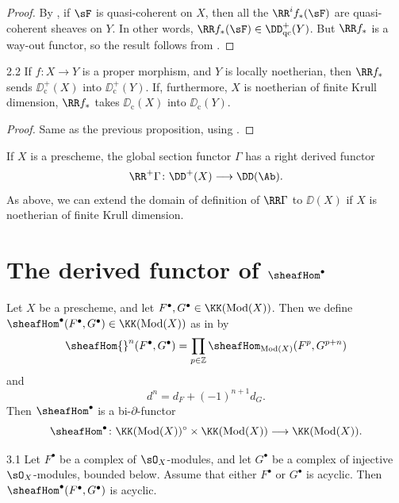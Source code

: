 \begin{proof}
By \cite[\nopp III,~1.4.10]{EGA}, if $\sF$ is quasi-coherent on $X$, then all the $\RR^if_*(\sF)$ are quasi-coherent sheaves on $Y$. In other words, $\RR f_*(\sF)\in\DD_{\mathrm{qc}}^+(Y)$. But $\RR f_*$ is a way-out functor, so the result follows from .
\end{proof}

\begin{bookproposition}{2.2}\label{prop:2.2.2}
If $f\colon X\to Y$ is a proper morphism, and $Y$ is locally noetherian, then $\RR f_*$ sends $\DD_{\mathrm{c}}^+(X)$ into $\DD_{\mathrm{c}}^+(Y)$. If, furthermore, $X$ is noetherian of finite Krull dimension, $\RR f_*$ takes $\DD_{\mathrm{c}}(X)$ into $\DD_{\mathrm{c}}(Y)$.
\end{bookproposition}

\begin{proof}
Same as the previous proposition, using \cite[\nopp III,~3.2.1]{EGA}.
\end{proof}

If $X$ is a prescheme, the global section functor $\Gamma$ has a right derived functor
\[
\RR^+\Gamma\colon \DD^+(X) \longrightarrow \DD(\Ab).
\]
As above, we can extend the domain of definition of $\RR\Gamma$ to $\DD(X)$ if $X$ is noetherian of finite Krull dimension.
\section{The derived functor of $\sheafHom^\bullet$}\label{sec:2.3}

Let $X$ be a prescheme, and let $F^\bullet,G^\bullet\in\KK(\operatorname{Mod}(X))$. Then we define $\sheafHom^\bullet(F^\bullet,G^\bullet)\in\KK(\operatorname{Mod}(X))$ as in  by
\[
\sheafHom{}^n(F^\bullet,G^\bullet) = \prod_{p\in\mathbb{Z}} \sheafHom_{\operatorname{Mod}(X)}(F^p, G^{p+n})
\]
and
\[
d^n = d_F + (-1)^{n+1} d_G.
\]
Then $\sheafHom^\bullet$ is a bi-$\partial$-functor
\[
\sheafHom^\bullet\colon \KK(\operatorname{Mod}(X))^\circ \times \KK(\operatorname{Mod}(X)) \longrightarrow \KK(\operatorname{Mod}(X)).
\]

\begin{booklemma}{3.1}\label{lem:2.3.1}
Let $F^\bullet$ be a complex of $\sO_X$-modules, and let $G^\bullet$ be a complex of injective $\sO_X$-modules, bounded below. Assume that either $F^\bullet$ or $G^\bullet$ is acyclic. Then $\sheafHom^\bullet(F^\bullet,G^\bullet)$ is acyclic.
\end{booklemma}

